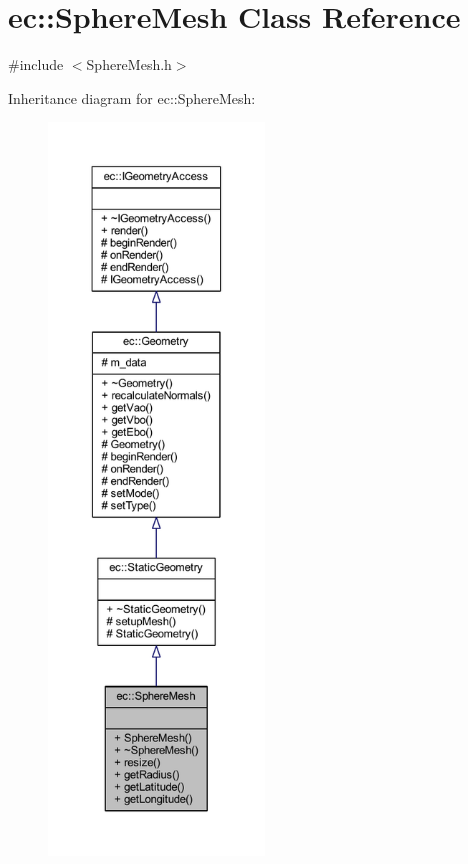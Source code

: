 \hypertarget{classec_1_1_sphere_mesh}{}\section{ec\+:\+:Sphere\+Mesh Class Reference}
\label{classec_1_1_sphere_mesh}


{\ttfamily \#include $<$Sphere\+Mesh.\+h$>$}



Inheritance diagram for ec\+:\+:Sphere\+Mesh\+:\nopagebreak
\begin{figure}[H]
\begin{center}
\leavevmode
\includegraphics[height=550pt]{classec_1_1_sphere_mesh__inherit__graph}
\end{center}
\end{figure}


